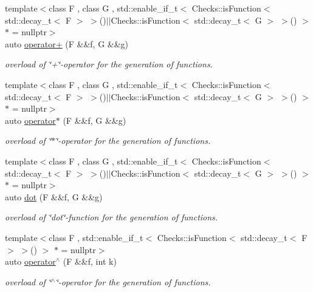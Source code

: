 \begin{DoxyCompactItemize}
{\footnotesize template$<$class F , class G , std\-::enable\-\_\-if\-\_\-t$<$ Checks\-::is\-Function$<$ std\-::decay\-\_\-t$<$ F $>$ $>$()$\vert$$\vert$\-Checks\-::is\-Function$<$ std\-::decay\-\_\-t$<$ G $>$ $>$() $>$ $\ast$  = nullptr$>$ }\\auto \hyperlink{namespacefuncy_af76531a9ab1782f6c5929bd10cedcb9d}{operator+} (F \&\&f, G \&\&g)
\begin{DoxyCompactList}\small\item\em overload of \char`\"{}+\char`\"{}-\/operator for the generation of functions. \end{DoxyCompactList}\item 
{\footnotesize template$<$class F , class G , std\-::enable\-\_\-if\-\_\-t$<$ Checks\-::is\-Function$<$ std\-::decay\-\_\-t$<$ F $>$ $>$()$\vert$$\vert$\-Checks\-::is\-Function$<$ std\-::decay\-\_\-t$<$ G $>$ $>$() $>$ $\ast$  = nullptr$>$ }\\auto \hyperlink{namespacefuncy_a5cfa272b773c3d6d3a4faef4fdfea9e2}{operator$\ast$} (F \&\&f, G \&\&g)
\begin{DoxyCompactList}\small\item\em overload of \char`\"{}$\ast$\char`\"{}-\/operator for the generation of functions. \end{DoxyCompactList}\item 
{\footnotesize template$<$class F , class G , std\-::enable\-\_\-if\-\_\-t$<$ Checks\-::is\-Function$<$ std\-::decay\-\_\-t$<$ F $>$ $>$()$\vert$$\vert$\-Checks\-::is\-Function$<$ std\-::decay\-\_\-t$<$ G $>$ $>$() $>$ $\ast$  = nullptr$>$ }\\auto \hyperlink{namespacefuncy_a3d455dfbb9efa1ed6bf765aeeffb6f50}{dot} (F \&\&f, G \&\&g)
\begin{DoxyCompactList}\small\item\em overload of \char`\"{}dot\char`\"{}-\/function for the generation of functions. \end{DoxyCompactList}\item 
{\footnotesize template$<$class F , std\-::enable\-\_\-if\-\_\-t$<$ Checks\-::is\-Function$<$ std\-::decay\-\_\-t$<$ F $>$ $>$() $>$ $\ast$  = nullptr$>$ }\\auto \hyperlink{namespacefuncy_a70f1aec5cb0d24bfb7397b98d1f64ac0}{operator$^\wedge$} (F \&\&f, int k)
\begin{DoxyCompactList}\small\item\em overload of \char`\"{}$^\wedge$\char`\"{}-\/operator for the generation of functions. \end{DoxyCompactList}\item 

\end{DoxyCompactItemize}
